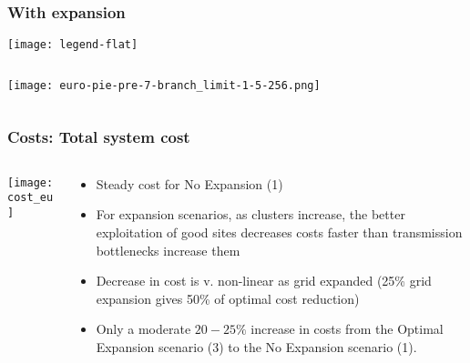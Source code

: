 \documentclass[10pt,aspectratio=169,dvipsnames]{beamer}
\let\olditem\item
\renewcommand{\item}{%
\olditem\vspace{5pt}}
\begin{document}
\begin{frame}
  \frametitle{With expansion}

  \texttt{[image: legend-flat]}
  \begin{columns}[T]

\begin{column}{8cm}

  \texttt{[image: euro-pie-pre-7-branch\_limit-1-5-256.png]}

\end{column}
\begin{column}{8cm}


\end{column}

\end{columns}


\end{frame}



\begin{frame}
  \frametitle{Costs: Total system cost}

\centering

\begin{columns}[T]
\begin{column}{8.5cm}
  \texttt{[image: cost\_eu]}

\end{column}
\begin{column}{7cm}

  \begin{itemize}
  \item Steady cost for No Expansion (1)
  \item For expansion scenarios, as clusters increase, the better exploitation of good sites decreases costs faster than transmission bottlenecks increase them
  \item Decrease in cost is v. non-linear as grid expanded (25\% grid expansion gives 50\% of optimal cost reduction)
  \item Only a moderate $20-25\%$ increase in costs from the Optimal Expansion
    scenario (3) to the No Expansion scenario (1).
  \end{itemize}

\end{column}

\end{columns}

\end{frame}
\end{document}
